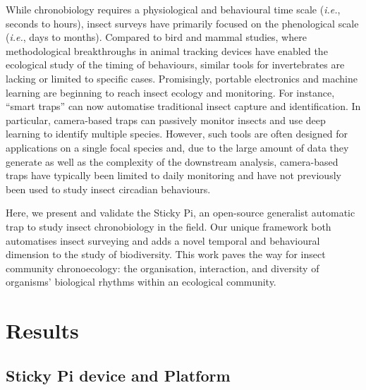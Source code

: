 \documentclass[fleqn,10pt]{wlscirep}
\begin{document}
While chronobiology requires a physiological and behavioural time scale (\emph{i.e.}, seconds to hours), insect surveys have primarily focused on the phenological scale (\emph{i.e.}, days to months). Compared to bird and mammal studies, where methodological breakthroughs in animal tracking devices have enabled the ecological study of the timing of behaviours, similar tools for invertebrates are lacking\cite{dominoni_methods_2017} or limited to specific cases\cite{brydegaard_daily_2016,goldshtein_long-term_2021,nunes-silva_applications_2019}. Promisingly, portable electronics and machine learning are beginning to reach insect ecology and monitoring\cite{hoye_deep_2021}. For instance, “smart traps” can now automatise traditional insect capture and identification\cite{cardim_ferreira_lima_automatic_2020}. In particular, camera-based traps can passively monitor insects and use deep learning to identify multiple species. However, such tools are often designed for applications on a single focal species and, due to the large amount of data they generate as well as the complexity of the downstream analysis, camera-based traps have typically been limited to daily monitoring and have not previously been used to study insect circadian behaviours.

Here, we present and validate the Sticky Pi, an open-source generalist automatic trap to study insect chronobiology in the field. Our unique framework both automatises insect surveying and adds a novel temporal and behavioural dimension to the study of biodiversity. This work paves the way for insect community chronoecology: the organisation, interaction, and diversity of organisms’ biological rhythms within an ecological community. 


\section*{Results}

\subsection*{Sticky Pi device and Platform}
\end{document}
